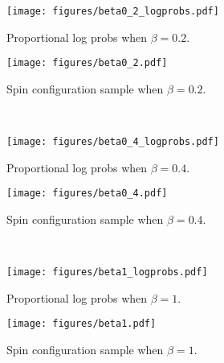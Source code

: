 \begin{figure}
\begin{subfigure}{.49\textwidth}
    \centering
    \texttt{[image: figures/beta0\_2\_logprobs.pdf]}
    \caption{Proportional log probs when $\beta = 0.2$.}
\end{subfigure}
%
\begin{subfigure}{.49\textwidth}
    \centering
    \texttt{[image: figures/beta0\_2.pdf]}
    \caption{Spin configuration sample when $\beta = 0.2$.}
\end{subfigure}
\\
\begin{subfigure}{.49\textwidth}
    \centering
    \texttt{[image: figures/beta0\_4\_logprobs.pdf]}
    \caption{Proportional log probs when $\beta = 0.4$.}
\end{subfigure}
%
\begin{subfigure}{.49\textwidth}
    \centering
    \texttt{[image: figures/beta0\_4.pdf]}
        \caption{Spin configuration sample when $\beta = 0.4$.}
\end{subfigure}
\\
\begin{subfigure}{.49\textwidth}
    \centering
    \texttt{[image: figures/beta1\_logprobs.pdf]}
    \caption{Proportional log probs when $\beta = 1$.}
\end{subfigure}
%
\begin{subfigure}{.49\textwidth}
    \centering
    \texttt{[image: figures/beta1.pdf]}
    \caption{Spin configuration sample when $\beta = 1$.}
\end{subfigure}
\caption{}
\label{fig:ising-results}
\end{figure}
